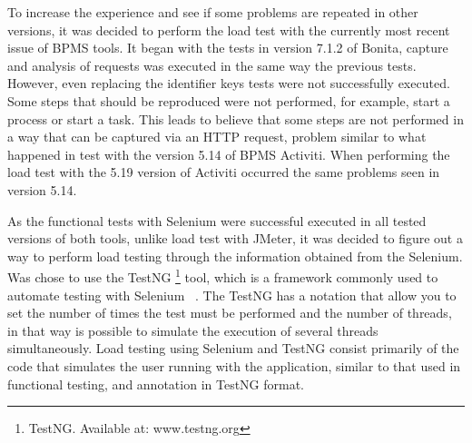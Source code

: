 \documentclass[runningheads,a4paper]{llncs}
\begin{document}
To increase the experience and see if some problems are repeated in other versions, it was decided to perform the load test with the currently most recent issue of BPMS tools. It began with the tests in version 7.1.2 of Bonita, capture and analysis of requests was executed in the same way the previous tests. However, even replacing the identifier keys tests were not successfully executed. Some steps that should be reproduced were not performed, for example, start a process or start a task. This leads to believe that some steps are not performed in a way that can be captured via an HTTP request, problem similar to what happened in test with the version 5.14 of BPMS Activiti. When performing the load test with the 5.19 version of Activiti occurred the same problems seen in version 5.14.


As the functional tests with Selenium were successful executed in all tested versions of both tools, 
unlike load test with JMeter, it was decided to figure out a way to perform load testing through the information obtained from the Selenium. Was chose to use the TestNG \footnote{TestNG. Available at: www.testng.org} tool, which is a framework commonly used to automate testing with Selenium ~\cite{bindal2014test}. The TestNG has a notation that allow you to set the number of times the test must be performed and the number of threads, in that way is possible to simulate the execution of several threads simultaneously. Load testing using Selenium and TestNG consist primarily of the code that simulates the user running with the application, similar to that used in functional testing, and annotation in TestNG format.
\end{document}

